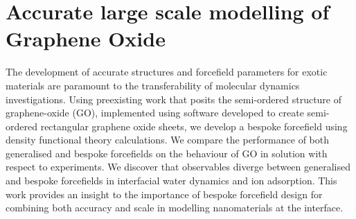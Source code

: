 \chapter{Accurate large scale modelling of Graphene Oxide}
\label{GO}
\vspace{-9mm}
The development of accurate structures and forcefield parameters for exotic materials are paramount to the transferability of molecular dynamics investigations. Using preexisting work that posits the semi-ordered structure of graphene-oxide (GO), implemented using software developed to create semi-ordered rectangular graphene oxide sheets, we develop a bespoke forcefield using density functional theory calculations. We compare the performance of both generalised and bespoke forcefields on the behaviour of GO in solution with respect to experiments. We discover that observables diverge between generalised and bespoke forcefields in interfacial water dynamics and ion adsorption. This work provides an insight to the importance of bespoke forcefield design for combining both accuracy and scale in modelling nanomaterials at the interface.  


